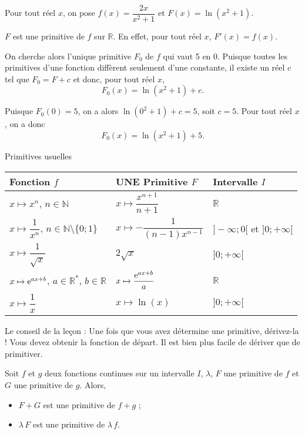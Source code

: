 \documentclass[11pt,fleqn, openany]{book} %
\begin{document}
\begin{example} Pour tout réel $x$, on pose $f(x)=\dfrac{2x}{x^2+1}$ et $F(x)=\ln(x^2+1)$. 

$F$ est une primitive de $f$ sur $\mathbb{R}$. En effet, pour tout réel $x$, $F'(x)=f(x)$.

On cherche alors l'unique primitive $F_0$ de $f$ qui vaut 5 en 0. Puisque toutes les primitives d'une fonction diffèrent seulement d'une constante, il existe un réel $c$ tel que $F_0=F+c$ et donc, pour tout réel $x$, \[F_0(x)=\ln(x^2+1)+c.\] 

Puisque $F_0(0)=5$, on a alors $\ln(0^2+1)+c=5$, soit $c=5$. Pour tout réel $x$, on a donc \[F_0(x)=\ln(x^2+1)+5.\]\vspace{-0.5cm}\end{example}



\begin{proposition}Primitives usuelles
\vskip10pt
\renewcommand{\arraystretch}{2}
\begin{tabularx}{\linewidth}{|X|X|X|}

\hline
Fonction $f$ & \textbf{UNE} Primitive $F$ & Intervalle $I$ \\
\hline
$x \mapsto x^n$, $n\in \mathbb{N}$ & $x\mapsto \dfrac{x^{n+1}}{n+1}$ & $\mathbb{R}$ \\
\hline
$x \mapsto \dfrac{1}{x^n}$, $n\in \mathbb{N}\setminus\{0;1\}$ & $x\mapsto -\dfrac{1}{(n-1)x^{n-1}}$ & $]-\infty;0[$ et $]0;+\infty[$ \\
\hline
$x\mapsto \dfrac{1}{\sqrt{x}}$ & $2\sqrt{x}$ & $]0;+\infty[$ \\
\hline
$x \mapsto \mathrm{e}^{ax+b}$, $a\in \mathbb{R}^*$, $b\in \mathbb{R}$ & $x\mapsto \dfrac{\mathrm{e}^{ax+b}}{a}$ & $\mathbb{R}$ \\
\hline
$x \mapsto \dfrac{1}{x}$ & $x\mapsto \ln(x)$ & $]0;+\infty[$ \\
\hline
\end{tabularx}\end{proposition}

Le conseil de la leçon : Une fois que vous avez détermine une primitive, dérivez-la ! Vous devez obtenir la fonction de départ. Il est bien plus facile de dériver que de primitiver.

\newpage
\begin{proposition}Soit $f$ et $g$ deux fonctions continues sur un intervalle $I$, $\lambda$, $F$ une primitive de $f$ et $G$ une primitive de $g$. Alors,
\begin{itemize}
\item $F+G$ est une primitive de $f+g$ ;
\item $\lambda\,F$ est une primitive de $\lambda\,f$.
\end{itemize}\end{proposition}
\end{document}
